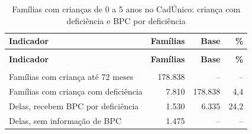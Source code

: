 {\small\setlength{\tabcolsep}{5pt}
\begin{longtable}{@{}>{\raggedright\arraybackslash}p{3.6cm}rrr@{}}
\caption{Famílias com crianças de 0 a 5 anos no CadÚnico: criança com deficiência e BPC por deficiência}\label{tab:cadunico-deficiencia-familias-0-a-5-2026}\\
\toprule \textbf{Indicador} & \textbf{Famílias} & \textbf{Base} & \textbf{\%} \\ \midrule \endfirsthead
\multicolumn{4}{@{}l}{\footnotesize\itshape (continuação)}\\ \toprule \textbf{Indicador} & \textbf{Famílias} & \textbf{Base} & \textbf{\%} \\ \midrule \endhead
\midrule \multicolumn{4}{r@{}}{\footnotesize\itshape (continua)}\\ \endfoot
\bottomrule \endlastfoot
Famílias com criança até 72 meses & 178.838 & -- & -- \\
Famílias com criança com deficiência & 7.810 & 178.838 & 4,4 \\
Delas, recebem BPC por deficiência & 1.530 & 6.335 & 24,2 \\
Delas, sem informação de BPC & 1.475 & -- & -- \\
\end{longtable}}
\vspace{-6pt}
